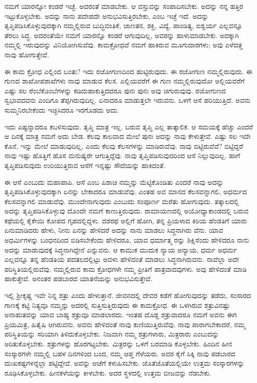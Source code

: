 ನಮಗೆ ಯಾರನ್ನೋ ಕಂಡರೆ ಇಚ್ಛೆ. ಅದರಂತೆ ಮಾಡಬೇಕು. ಆ ವಸ್ತುವನ್ನು ಸಂಪಾದಿಸಬೇಕು. ಅದನ್ನು ನನ್ನ ಹತ್ತಿರ ಇಟ್ಟುಕೊಳ್ಳಬೇಕು. ಅದನ್ನು ನಾನು ಪದೇಪದೇ ಅನುಭವಿಸುತ್ತಿರಬೇಕು, ಎಂಬ ಇಚ್ಛೆ ಇದೆ. ಅದನ್ನು ತೃಪ್ತಿಪಡಿಸಿಕೊಳ್ಳುವುದಕ್ಕಾಗಿ ನಮ್ಮಲ್ಲಿರುವ ಬುದ್ಧಿವಂತಿಕೆ, ಜಾಣತನ, ಶಕ್ತಿ, ವಿದ್ಯೆ, ಪಾಂಡಿತ್ಯ, ಐಶ್ವರ್ಯ ಎಲ್ಲವನ್ನೂ ತೆರಲು ಸಿದ್ಧ. ಅದರಂತೆಯೇ ನಮಗೆ ಯಾರನ್ನೊ ಕಂಡರೆ ಆಗುವುದಿಲ್ಲ, ಅವರನ್ನು ಹಾಳುಮಾಡಬೇಕು. ಅದಕ್ಕಾಗಿ ನಮ್ಮಲ್ಲಿ ಇರುವುದನ್ನು ವಿನಿಯೋಗಿಸುವೆವು. ಕಾಮಕ್ರೋಧವೆ ನಮಗೆ ಹಾಕಿರುವ ಮೂಗುದಾರಗಳು; ಅವು ಎಳೆದತ್ತ ನಾವು ಹೋಗುತ್ತೇವೆ.

ಈ ಕಾಮ ಕ್ರೋಧ ಎಲ್ಲಿಂದ ಬಂತು? ಇದು ರಜೋಗುಣದಿಂದ ಹುಟ್ಟಿರುವುದು. ಈ ರಜೋಗುಣ ನಮ್ಮಲ್ಲಿರುವುದು. ಈ ಗುಣದ ಶಾಖೋಪಶಾಖೆಗಳು ನಾವು ಮಾಡುವ ಕೆಲಸ. ಎಲ್ಲಿಯವರೆಗೆ ಈ ಗುಣ ನಮ್ಮಲ್ಲಿರುವುದೋ ಅಲ್ಲಿಯವರೆಗೆ ಎಷ್ಟು ಸಲ ರೆಂಬೆಕೊಂಬೆಗಳನ್ನು ಕಡಿದುಹಾಕುತ್ತಿದದರೂ ಪುನಃ ಪುನಃ ಅವು ಚಿಗುರುವುವು. ರಜೋಗುಣದ ಸ್ವಭಾವದವನು ಎಂದಿಗೂ ತೆಪ್ಪಗಿರುವುದಿಲ್ಲ. ಏನಾದರೂ ಮಾಡುತ್ತಲೇ ಇರುವನು. ಒಳಗೆ ಆಸೆ ಹರಿಯುತ್ತಿದೆ. ಅವನು ಸುಮ್ಮನಿರಬೇಕೆಂದು ಇಚ್ಛಿಸಿದರೂ ಇರಗೊಡದು ಅದು.

ಇದು ಎಷ್ಟನ್ನಾದರೂ ಕಬಳಿಸುವುದು. ತೃಪ್ತಿ ಮಾತ್ರ ಇಲ್ಲ. ಬರುವ ತೃಪ್ತಿ ಎಲ್ಲ ತಾತ್ಕಾಲಿಕ. ಆ ಸಮಯಕ್ಕೆ ಹೆಚ್ಚು ಎಂದರೆ ಆ ದಿನಕ್ಕೆ ಮಾತ್ರ ನಮಗೆ ಅದು ಬೇಡ. ಕೆಲವು ಕಾಲವಾದ ಮೇಲೆ ಪುನಃ ಅದನ್ನು ನಾವು ಕೇಳುತ್ತೇವೆ. ಎಷ್ಟು ಸಲ ಇದೇ ಕೊನೆ, ಇನ್ನು ಮೇಲೆ ಮಾಡುವುದಿಲ್ಲ, ಎಂದು ಕೆಲವು ಕೆಲಸಗಳನ್ನು ಮಾಡಿರುವೆವು. ನಾವು ಬಿಟ್ಟಿರುವೆವೆ? ಬಿಟ್ಟಿದ್ದರೆ ನಾವು ಇಷ್ಟು ಹೊತ್ತಿಗೆ ಹೊಸ ಮನುಷ್ಯರೇ ಆಗುತ್ತಿದ್ದೆವು. ನಾವು ತೃಪ್ತಿಪಡಿಸುವುದರಿಂದ ಆಸೆ ನಿಲ್ಲುವುದಿಲ್ಲ. ಹಾಗೆ ತೃಪ್ತಿಪಡಿಸುವುದು ಉರಿಯುತ್ತಿರುವ ಆಸೆಗೆ ಇನ್ನಷ್ಟು ಸೌದೆಯನ್ನು ಹಾಕಿದಂತೆ.

ಈ ಆಸೆ ಎಂಬುದು ಮಹಾಪಾಪಿ. ಆಸೆ ಎಂಬ ಪಿಶಾಚಿ ನಮ್ಮನ್ನು ಮೆಟ್ಟಿಕೊಂಡಿತು ಎಂದರೆ ನಾವು ಅದನ್ನು ತೃಪ್ತಿಪಡಿಸಿಕೊಳ್ಳುವುದಕ್ಕಾಗಿ ಏನನ್ನು ಬೇಕಾದರೂ ಮಾಡುವೆವು. ಎಂತಹ ಅವ ಮಾನದ ಕೆಲಸವನ್ನಾಗಲಿ, ಅಧರ್ಮದ ಕೆಲಸವನ್ನಾಗಲಿ ಮಾಡುವೆವು. ಮುಂದೇನಾಗುವುದು ಎಂಬುದು ಸಂಪೂರ್ಣ ಮರೆತು ಹೋಗುವುದು. ತತ್ಕಾಲದಲ್ಲಿ ಅದನ್ನು ತೃಪ್ತಿಪಡಿಸಿಕೊಳ್ಳುವು ದೊಂದೇ ನಮಗೆ ಕಾಣುತ್ತಿರುವುದು. ರಾಮಾಯಣದಲ್ಲಿ ಅಯೋಧ್ಯಾಕಾಂಡದಲ್ಲಿ ಬರುವ ಕಥೆಯಲ್ಲಿ ಕೈಕೇಯಿ ಕೋಪದ ಗೃಹದಲ್ಲಿದ್ದಳು. ದಶರಥ ಅಲ್ಲಿಗೆ ಹೋಗಿ, ತನ್ನ ಪ್ರಿಯಳಾದ ಕಿರಿಯ ಹೆಂಡತಿಗೆ ಯಾರು ಏನುಮಾಡಿದರು ಹೇಳು, ನೀನು ಏನನ್ನು ಹೇಳಿದರೆ ಅದನ್ನು ನಾನು ಮಾಡಲು ಸಿದ್ಧನಾಗಿರು ವೆನು. ಯಾವ ಅಧರ್ಮಿಗಳನ್ನು ಬಂಧನದಿಂದ ಬಿಡಿಸಬೇಕೆಂದು ಹೇಳಿದರೂ, ಯಾವ ಧರ್ಮಾತ್ಮ ರನ್ನು ಶಿಕ್ಷಿಸೆಂದು ಹೇಳಿದರೂ ನಾನು ಅದನ್ನು ಮಾಡುವುದಕ್ಕೆ ಸಿದ್ಧನಾಗಿದ್ದೇನೆ ಎನ್ನುವನು. ಆ ಕಾಮುಕ ಮುದುಕ ನ್ಯಾಯ ಅನ್ಯಾಯ, ಧರ್ಮ ಅಧರ್ಮ ಎಲ್ಲವನ್ನೂ ತನ್ನ ಹೆಂಡತಿಯ ಪದತಲದಲ್ಲಿಟ್ಟು ಅವಳು ಹೇಳಿದಂತೆ ಮಾಡಲು ಸಿದ್ಧನಾಗಿರುವನು. ನಾವೆಲ್ಲಾ ಅದೇ ಪರಿಸ್ಥಿತಿಯಲ್ಲಿರುವೆವು. ನಮ್ಮಲ್ಲಿರುವ ಕಾಮ ಕ್ರೋಧಗಳೇ ನಮ್ಮ ಪ್ರೀತಿಗೆ ಪಾತ್ರವಾದವುಗಳು. ಅವು ಹೇಳಿದಂತೆ ಮಾಡಿ ಹಾಕುತ್ತೇವೆ. ಅನಂತರ ಪಡಬಾರದ ಯಾತನೆಯನ್ನು ಅನುಭವಿಸುತ್ತೇವೆ.

ಇಲ್ಲಿ ಶ‍್ರೀಕೃಷ್ಣ ಇವೇ ನಿನ್ನ ಶತ್ರು ಎಂದು ಹೇಳುತ್ತಾನೆ. ಜೀವನದಲ್ಲಿ ದೇವರ ಕಡೆಗೆ ಹೋಗುವುದನ್ನು ತಡೆದು, ಸಂಸಾರದ ಗಾಣಕ್ಕೆ ಕಟ್ಟಿ ನಿತ್ಯವೂ ನಮ್ಮನ್ನು ಅದರಲ್ಲಿ ಸುತ್ತಿಸುತ್ತಿರುವುದು ಈ ಕಾಮಕ್ರೋಧ. ಈ ಒಳಗಿರುವ ಶತ್ರುವಿನಷ್ಟು ಅನಾಹುತವನ್ನು ಯಾವ ಬಾಹ್ಯ ಶತ್ರುವೂ ಮಾಡಲಾರದು. ಇಂತಹ ದೊಡ್ಡ ಶತ್ರುವಾದರೂ ನಮಗೆ ಅವನು ಈಗ ಪ್ರಿಯಮಿತ್ರ, ಹಿತೈಷಿ ಆಗಿರುವನು. ಅವನು ಹೇಳಿದಂತೆ ನಾವು ಕುಣಿಯುತ್ತಿರುವೆವು. ನಾವು ಪಾರಾಗಬೇಕಾದರೆ, ನಮ್ಮ ಪರಿಸ್ಥಿತಿಯನ್ನು ಸರಿಯಾಗಿ ತಿಳಿದುಕೊಳ್ಳಬೇಕು. ನಿಜವಾಗಿ ನಮ್ಮ ಶತ್ರುಗಳಾರು, ಮಿತ್ರರಾರು ಎಂಬುದನ್ನು ಅರಿತುಕೊಳ್ಳಬೇಕು. ಶತ್ರುಗಳನ್ನು ಹೊರಗಟ್ಟಬೇಕು. ಮಿತ್ರರನ್ನು ಒಳಗೆ ಬರಮಾಡಿ ಕೊಳ್ಳಬೇಕು. ಹಿಂದಿನ ಹೀನ ಸಂಸ್ಕಾರಗಳೇ ನಮ್ಮಲ್ಲಿ ಬಹಳ ದಿನಗಳಿಂದ ಬಂದ, ನಮ್ಮ ಆಪ್ತ ಗೆಳೆಯರು. ಅವರ ಕೈಗೆ ಸಿಕ್ಕಿ ನಾವು ಪಡಬಾರದ ದುಃಖಕಷ್ಟಗಳನ್ನೆಲ್ಲಾ ಪಟ್ಟಿದ್ದೇವೆ. ಅವನ್ನು ಆಚೆಗೆ ಕಳುಹಿಸಬೇಕು. ಜೊತೆಜೊತೆಯಲ್ಲಿಯೇ ಉತ್ತಮ ಸಂಸ್ಕಾರಗಳನ್ನು ರೂಢಿಸಿಕೊಳ್ಳಬೇಕು. ಹೀನಕಳೆಯನ್ನು ಕೀಳಬೇಕು. ಅದರ ಸ್ಥಳದಲ್ಲಿ ಉತ್ತಮ ಬೀಜವನ್ನು ನೆಡಬೇಕು.

